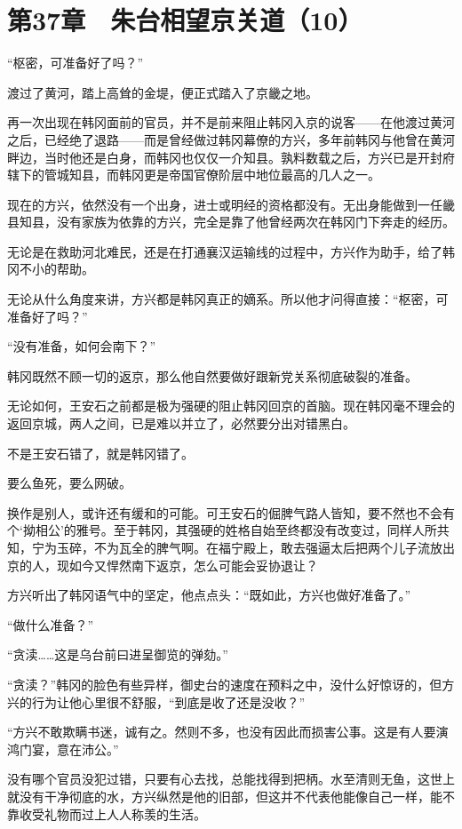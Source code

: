 \section{第37章　朱台相望京关道（10）}

“枢密，可准备好了吗？”

渡过了黄河，踏上高耸的金堤，便正式踏入了京畿之地。

再一次出现在韩冈面前的官员，并不是前来阻止韩冈入京的说客——在他渡过黄河之后，已经绝了退路——而是曾经做过韩冈幕僚的方兴，多年前韩冈与他曾在黄河畔边，当时他还是白身，而韩冈也仅仅一介知县。孰料数载之后，方兴已是开封府辖下的管城知县，而韩冈更是帝国官僚阶层中地位最高的几人之一。

现在的方兴，依然没有一个出身，进士或明经的资格都没有。无出身能做到一任畿县知县，没有家族为依靠的方兴，完全是靠了他曾经两次在韩冈门下奔走的经历。

无论是在救助河北难民，还是在打通襄汉运输线的过程中，方兴作为助手，给了韩冈不小的帮助。

无论从什么角度来讲，方兴都是韩冈真正的嫡系。所以他才问得直接：“枢密，可准备好了吗？”

“没有准备，如何会南下？”

韩冈既然不顾一切的返京，那么他自然要做好跟新党关系彻底破裂的准备。

无论如何，王安石之前都是极为强硬的阻止韩冈回京的首脑。现在韩冈毫不理会的返回京城，两人之间，已是难以并立了，必然要分出对错黑白。

不是王安石错了，就是韩冈错了。

要么鱼死，要么网破。

换作是别人，或许还有缓和的可能。可王安石的倔脾气路人皆知，要不然也不会有个‘拗相公’的雅号。至于韩冈，其强硬的姓格自始至终都没有改变过，同样人所共知，宁为玉碎，不为瓦全的脾气啊。在福宁殿上，敢去强逼太后把两个儿子流放出京的人，现如今又悍然南下返京，怎么可能会妥协退让？

方兴听出了韩冈语气中的坚定，他点点头：“既如此，方兴也做好准备了。”

“做什么准备？”

“贪渎……这是乌台前曰进呈御览的弹劾。”

“贪渎？”韩冈的脸色有些异样，御史台的速度在预料之中，没什么好惊讶的，但方兴的行为让他心里很不舒服，“到底是收了还是没收？”

“方兴不敢欺瞒书迷，诚有之。然则不多，也没有因此而损害公事。这是有人要演鸿门宴，意在沛公。”

没有哪个官员没犯过错，只要有心去找，总能找得到把柄。水至清则无鱼，这世上就没有干净彻底的水，方兴纵然是他的旧部，但这并不代表他能像自己一样，能不靠收受礼物而过上人人称羡的生活。

